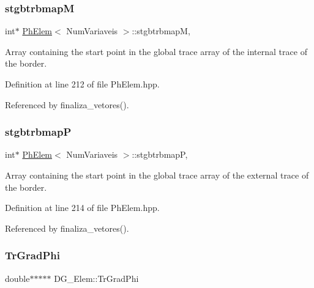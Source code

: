 \subsubsection{\texorpdfstring{stgbtrbmapM}{stgbtrbmapM}}
{\footnotesize\ttfamily int$\ast$ \hyperlink{classPhElem}{Ph\+Elem}$<$ Num\+Variaveis $>$\+::stgbtrbmapM\hspace{0.3cm}{\ttfamily [protected]}, {\ttfamily [inherited]}}



Array containing the start point in the global trace array of the internal trace of the border. 



Definition at line 212 of file Ph\+Elem.\+hpp.



Referenced by finaliza\+\_\+vetores().

\mbox{\label{classPhElem_a6b38afded290e7a4cfb4a215a7ebec4e}} 
\subsubsection{\texorpdfstring{stgbtrbmapP}{stgbtrbmapP}}
{\footnotesize\ttfamily int$\ast$ \hyperlink{classPhElem}{Ph\+Elem}$<$ Num\+Variaveis $>$\+::stgbtrbmapP\hspace{0.3cm}{\ttfamily [protected]}, {\ttfamily [inherited]}}



Array containing the start point in the global trace array of the external trace of the border. 



Definition at line 214 of file Ph\+Elem.\+hpp.



Referenced by finaliza\+\_\+vetores().

\mbox{\label{classDG__Elem_acb3ed0d11e27ceae8f0f7c33496aa7e8}} 
\subsubsection{\texorpdfstring{Tr\+Grad\+Phi}{TrGradPhi}}
{\footnotesize\ttfamily double$\ast$$\ast$$\ast$$\ast$$\ast$ D\+G\+\_\+\+Elem\+::\+Tr\+Grad\+Phi\hspace{0.3cm}{\ttfamily [private]}}



